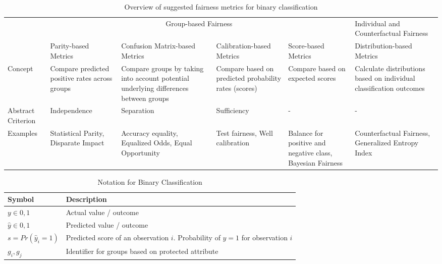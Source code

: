 \begin{table}[h]
    \scriptsize
    \centering
    \begin{tabularx}{\textwidth}{p{}@{\hskip 0.15in}X@{\hskip 0.15in}X@{\hskip 0.15in}X@{\hskip 0.15in}X@{\hskip 0.15in}p{}}
        \toprule
        & \multicolumn{4}{c}{Group-based Fairness} & Individual and Counterfactual Fairness \\
        \cmidrule(lr){2-5} \cmidrule(lr){6-6}
         & Parity-based Metrics & Confusion Matrix-based Metrics & Calibration-based Metrics & Score-based Metrics & Distribution-based Metrics  \\%
        \midrule
        Concept & Compare predicted positive rates across groups & Compare groups by taking into account potential underlying differences between groups & Compare based on predicted probability rates (scores) & Compare based on expected scores & Calculate distributions based on individual classification outcomes \\
        Abstract Criterion & Independence & Separation & Sufficiency & - & - \\
        Examples & Statistical Parity, Disparate Impact & Accuracy equality, Equalized Odds, Equal Opportunity & Test fairness, Well calibration & Balance for positive and negative class, Bayesian Fairness & Counterfactual Fairness, Generalized Entropy Index \\
        \bottomrule        
    \end{tabularx}
    \caption{Overview of suggested fairness metrics for binary classification}
    \label{tbl:metricoverview}
    \tightentab
\end{table}
\newcommand\MyBox[2]{
  \fbox{\lower0.75cm
    \vbox to 1.7cm{\vfil
      \hbox to 1.7cm{\hfil\parbox{1.4cm}{#1\\#2}\hfil}
      \vfil}
  }
}
\begin{table}{}
    \centering
    \scriptsize
    \begin{tabularx}{0.8\textwidth}{p{3cm}X}  
        \toprule
        Symbol   & Description \\
        \midrule
        $y\in {0, 1}$ & Actual value / outcome \\
        $\hat{y}\in {0, 1}$ & Predicted value / outcome \\
        $s=Pr(\hat{y}_i=1)$ & Predicted score of an observation $i$. Probability of $y=1$ for observation $i$ \\
        $g_i, g_j$ & Identifier for groups based on protected attribute \\
        \bottomrule
    \end{tabularx}
    \caption{Notation for Binary Classification}
    \label{tbl:notationclassification}
    \tightentab
\end{table}

